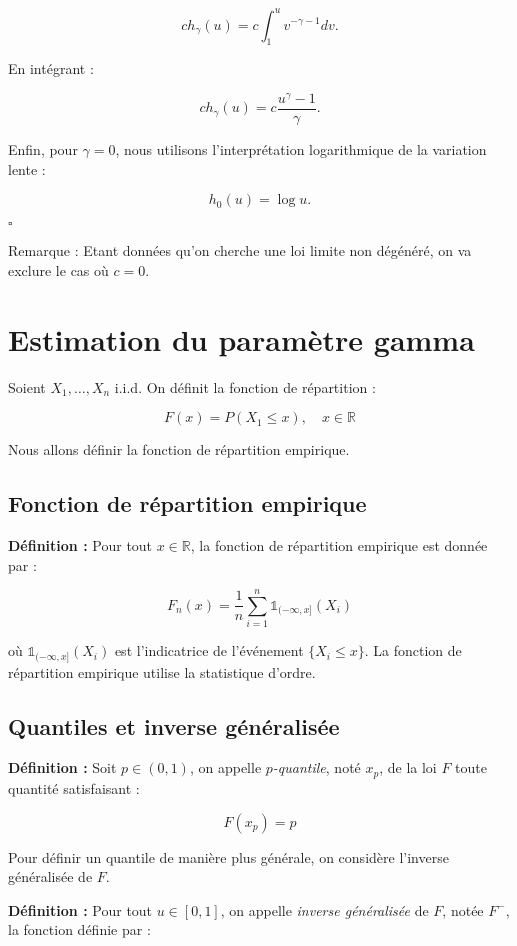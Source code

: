 \documentclass{article}
\begin{document}
\[
ch_\gamma (u) = c \int_1^u v^{-\gamma - 1} dv.
\]

En intégrant :

\[
ch_\gamma (u) = c \frac{u^\gamma - 1}{\gamma}.
\]

Enfin, pour \( \gamma = 0 \), nous utilisons l'interprétation logarithmique de la variation lente :

\[
h_0 (u) = \log u.
\]

\hfill\(\square\)

Remarque : Etant données qu'on cherche une loi limite non dégénéré, on va exclure le cas où $c = 0$.
\section{Estimation du paramètre gamma} 

Soient \(X_1, \dots, X_n\) i.i.d. On définit la fonction de répartition :

\[
F(x) = P(X_1 \leq x), \quad x \in \mathbb{R}
\]

Nous allons définir la fonction de répartition empirique.

\subsection{Fonction de répartition empirique}

\textbf{Définition :} Pour tout \(x \in \mathbb{R}\), la fonction de répartition empirique est donnée par :

\[
F_n(x) = \frac{1}{n} \sum_{i=1}^{n} \mathbb{1}_{(-\infty, x]}(X_i)
\]

où \(\mathbb{1}_{(-\infty, x]}(X_i)\) est l'indicatrice de l'événement \(\{X_i \leq x\}\).
La fonction de répartition empirique utilise la statistique d'ordre.

\subsection{Quantiles et inverse généralisée}

\textbf{Définition :} Soit \(p \in (0,1)\), on appelle \textit{\(p\)-quantile}, noté \(x_p\), de la loi \(F\) toute quantité satisfaisant :

\[
F(x_p) = p
\]

Pour définir un quantile de manière plus générale, on considère l'inverse généralisée de \(F\).

\textbf{Définition :} Pour tout \(u \in [0,1]\), on appelle \textit{inverse généralisée} de \(F\), notée \(F^-\), la fonction définie par :
\end{document}

